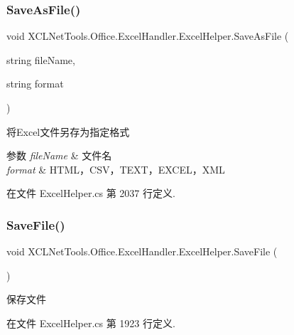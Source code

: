 \subsubsection{\texorpdfstring{Save\+As\+File()}{SaveAsFile()}\hspace{0.1cm}{\footnotesize\ttfamily [3/3]}}
{\footnotesize\ttfamily void X\+C\+L\+Net\+Tools.\+Office.\+Excel\+Handler.\+Excel\+Helper.\+Save\+As\+File (\begin{DoxyParamCaption}\item[{string}]{file\+Name,  }\item[{string}]{format }\end{DoxyParamCaption})}



将\+Excel文件另存为指定格式 


\begin{DoxyParams}{参数}
{\em file\+Name} & 文件名\\
\hline
{\em format} & H\+T\+M\+L，\+C\+S\+V，\+T\+E\+X\+T，\+E\+X\+C\+E\+L，\+X\+ML\\
\hline
\end{DoxyParams}


在文件 Excel\+Helper.\+cs 第 2037 行定义.

\mbox{\label{class_x_c_l_net_tools_1_1_office_1_1_excel_handler_1_1_excel_helper_a85e4eb3e29066ce7d82fab75fcb713ab}} 
\subsubsection{\texorpdfstring{Save\+File()}{SaveFile()}\hspace{0.1cm}{\footnotesize\ttfamily [1/2]}}
{\footnotesize\ttfamily void X\+C\+L\+Net\+Tools.\+Office.\+Excel\+Handler.\+Excel\+Helper.\+Save\+File (\begin{DoxyParamCaption}{ }\end{DoxyParamCaption})}



保存文件 



在文件 Excel\+Helper.\+cs 第 1923 行定义.


